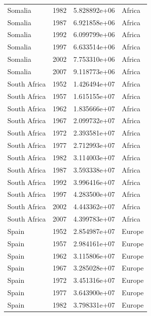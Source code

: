 \documentclass[
  letterpaper,
  DIV=11,
  numbers=noendperiod]{scrreprt}
\begin{document}
\begin{tcolorbox}
\begin{tabular}{lrrl}
Somalia                  &  1982 &  5.828892e+06 &    Africa \\
Somalia                  &  1987 &  6.921858e+06 &    Africa \\
Somalia                  &  1992 &  6.099799e+06 &    Africa \\
Somalia                  &  1997 &  6.633514e+06 &    Africa \\
Somalia                  &  2002 &  7.753310e+06 &    Africa \\
Somalia                  &  2007 &  9.118773e+06 &    Africa \\
South Africa             &  1952 &  1.426494e+07 &    Africa \\
South Africa             &  1957 &  1.615155e+07 &    Africa \\
South Africa             &  1962 &  1.835666e+07 &    Africa \\
South Africa             &  1967 &  2.099732e+07 &    Africa \\
South Africa             &  1972 &  2.393581e+07 &    Africa \\
South Africa             &  1977 &  2.712993e+07 &    Africa \\
South Africa             &  1982 &  3.114003e+07 &    Africa \\
South Africa             &  1987 &  3.593338e+07 &    Africa \\
South Africa             &  1992 &  3.996416e+07 &    Africa \\
South Africa             &  1997 &  4.283500e+07 &    Africa \\
South Africa             &  2002 &  4.443362e+07 &    Africa \\
South Africa             &  2007 &  4.399783e+07 &    Africa \\
Spain                    &  1952 &  2.854987e+07 &    Europe \\
Spain                    &  1957 &  2.984161e+07 &    Europe \\
Spain                    &  1962 &  3.115806e+07 &    Europe \\
Spain                    &  1967 &  3.285028e+07 &    Europe \\
Spain                    &  1972 &  3.451316e+07 &    Europe \\
Spain                    &  1977 &  3.643900e+07 &    Europe \\
Spain                    &  1982 &  3.798331e+07 &    Europe \\

\end{tabular}
\end{tcolorbox}
\end{document}
